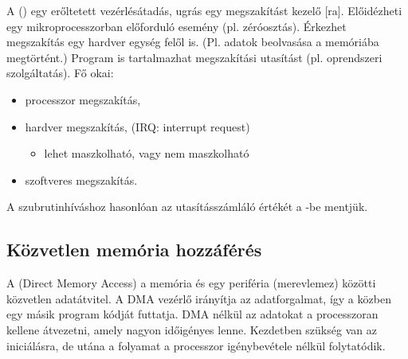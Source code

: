 \documentclass[../main.tex]{subfiles}
\begin{document}
A  () egy erőltetett vezérlésátadás,
ugrás egy megszakítást kezelő [ra]. Előidézheti egy
mikroprocesszorban előforduló esemény (pl. zéróosztás).
Érkezhet megszakítás egy hardver egység felől is. (Pl. adatok beolvasása a
memóriába megtörtént.) Program is tartalmazhat megszakítási utasítást
(pl. oprendszeri szolgáltatás). Fő okai:
\begin{itemize}
  \item processzor megszakítás,
  \item hardver megszakítás, (IRQ: interrupt request)
        \begin{itemize}
          \item lehet maszkolható, vagy nem maszkolható
        \end{itemize}
  \item szoftveres megszakítás.
\end{itemize}
A szubrutinhíváshoz hasonlóan az utasításszámláló értékét a -be
mentjük.

\subsection{Közvetlen memória hozzáférés}

A  (Direct Memory Access) a memória és egy periféria (merevlemez)
közötti közvetlen adatátvitel. A DMA vezérlő irányítja az adatforgalmat,
így a  közben egy másik program kódját futtatja. DMA nélkül az
adatokat a processzoran kellene átvezetni, amely nagyon időigényes lenne.
Kezdetben szükség van az iniciálásra, de utána a folyamat a processzor
igénybevétele nélkül folytatódik.
\end{document}
